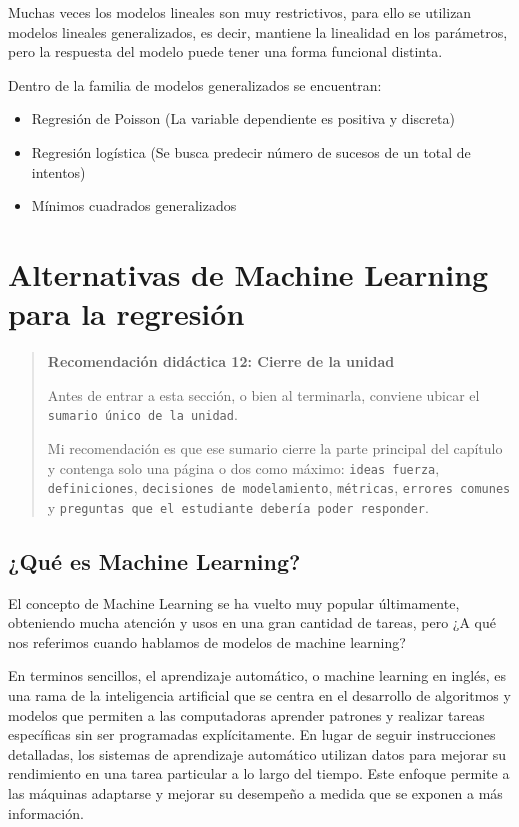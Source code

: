 \documentclass[
]{book}
\providecommand{\tightlist}{%
  \setlength{\itemsep}{0pt}\setlength{\parskip}{0pt}}
\begin{document}
Muchas veces los modelos lineales son muy restrictivos, para ello se
utilizan modelos lineales generalizados, es decir, mantiene la
linealidad en los parámetros, pero la respuesta del modelo puede tener
una forma funcional distinta.

Dentro de la familia de modelos generalizados se encuentran:

\begin{itemize}
\tightlist
\item
  Regresión de Poisson (La variable dependiente es positiva y
  discreta)
\item
  Regresión logística (Se busca predecir número de sucesos de un total
  de intentos)
\item
  Mínimos cuadrados generalizados
\end{itemize}

\section{Alternativas de Machine Learning para la regresión}\label{alternativas-de-machine-learning-para-la-regresiuxf3n-1}

\begin{quote}
\textbf{Recomendación didáctica 12: Cierre de la unidad}

Antes de entrar a esta sección, o bien al terminarla, conviene ubicar
el \texttt{sumario\ único\ de\ la\ unidad}.

Mi recomendación es que ese sumario cierre la parte principal del
capítulo y contenga solo una página o dos como máximo:
\texttt{ideas\ fuerza}, \texttt{definiciones}, \texttt{decisiones\ de\ modelamiento},
\texttt{métricas}, \texttt{errores\ comunes} y \texttt{preguntas\ que\ el\ estudiante\ debería\ poder\ responder}.
\end{quote}

\subsection{¿Qué es Machine Learning?}\label{quuxe9-es-machine-learning-1}

El concepto de Machine Learning se ha vuelto muy popular últimamente,
obteniendo mucha atención y usos en una gran cantidad de tareas, pero ¿A
qué nos referimos cuando hablamos de modelos de machine learning?

En terminos sencillos, el aprendizaje automático, o machine learning en
inglés, es una rama de la inteligencia artificial que se centra en el
desarrollo de algoritmos y modelos que permiten a las computadoras
aprender patrones y realizar tareas específicas sin ser programadas
explícitamente. En lugar de seguir instrucciones detalladas, los
sistemas de aprendizaje automático utilizan datos para mejorar su
rendimiento en una tarea particular a lo largo del tiempo. Este enfoque
permite a las máquinas adaptarse y mejorar su desempeño a medida que se
exponen a más información.
\end{document}
